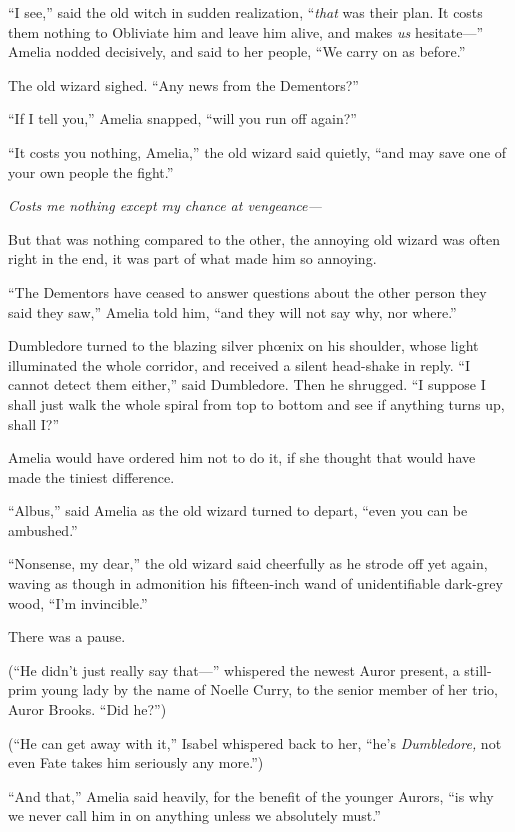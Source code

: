 “I see,” said the old witch in sudden realization, “\emph{that} was their plan. It costs them nothing to Obliviate him and leave him alive, and makes \emph{us} hesitate—” Amelia nodded decisively, and said to her people, “We carry on as before.”

The old wizard sighed. “Any news from the Dementors?”

“If I tell you,” Amelia snapped, “will you run off again?”

“It costs you nothing, Amelia,” the old wizard said quietly, “and may save one of your own people the fight.”

\emph{Costs me nothing except my chance at vengeance—}

But that was nothing compared to the other, the annoying old wizard was often right in the end, it was part of what made him so annoying.

“The Dementors have ceased to answer questions about the other person they said they saw,” Amelia told him, “and they will not say why, nor where.”

Dumbledore turned to the blazing silver phœnix on his shoulder, whose light illuminated the whole corridor, and received a silent head-shake in reply. “I cannot detect them either,” said Dumbledore. Then he shrugged. “I suppose I shall just walk the whole spiral from top to bottom and see if anything turns up, shall I?”

Amelia would have ordered him not to do it, if she thought that would have made the tiniest difference.

“Albus,” said Amelia as the old wizard turned to depart, “even you can be ambushed.”

“Nonsense, my dear,” the old wizard said cheerfully as he strode off yet again, waving as though in admonition his fifteen-inch wand of unidentifiable dark-grey wood, “I’m invincible.”

There was a pause.

(“He didn’t just really say that—” whispered the newest Auror present, a still-prim young lady by the name of Noelle Curry, to the senior member of her trio, Auror Brooks. “Did he?”)

(“He can get away with it,” Isabel whispered back to her, “he’s \emph{Dumbledore,} not even Fate takes him seriously any more.”)

“And that,” Amelia said heavily, for the benefit of the younger Aurors, “is why we never call him in on anything unless we absolutely must.”

\later

